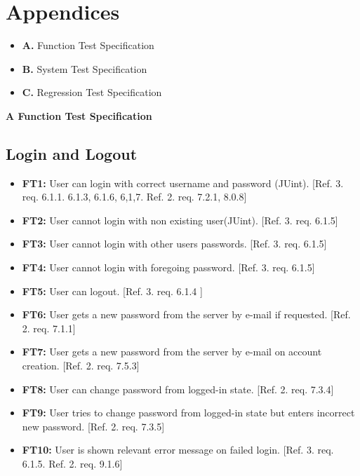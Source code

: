 \documentclass{article}
\begin{document}
\section{Appendices}
	\begin{itemize}
		\item \textbf{A.} Function Test Specification 
		\item \textbf{B.} System Test Specification 	
		\item \textbf{C.} Regression Test Specification 
		\end{itemize}
	
	\newpage
		\begin{flushleft}
		{\large \textbf{A Function Test Specification}}
		\end{flushleft}
		
		\subsection{Login and Logout}
		
		\begin{itemize}
  			\item \textbf{FT1:} User can login with correct username and password (JUint). [Ref. 3. req. 6.1.1. 6.1.3, 6.1.6, 6,1,7. Ref. 2. req. 7.2.1, 8.0.8]	
			
			\item \textbf{FT2:} User cannot login with non existing user(JUint). [Ref. 3. req. 6.1.5]
			
			\item \textbf{FT3:} User cannot login with other users passwords. [Ref. 3. req. 6.1.5]
			
			\item \textbf{FT4:} User cannot login with foregoing password. [Ref. 3. req. 6.1.5]
				
			\item \textbf{FT5:} User can logout. [Ref. 3. req. 6.1.4 ]
			
  			\item \textbf{FT6:} User gets a new password from the server by e-mail if requested. [Ref. 2. req. 7.1.1]
  			
  			\item \textbf{FT7:} User gets a new password from the server by e-mail on account creation. [Ref. 2. req. 7.5.3]
  					
  			\item \textbf{FT8:} User can change password from logged-in state. [Ref. 2. req. 7.3.4] 
  						
  			\item \textbf{FT9:} User tries to change password from logged-in state but enters incorrect new password. [Ref. 2. req. 7.3.5] 

  			\item \textbf{FT10:} User is shown relevant error message on failed login. [Ref. 3. req. 6.1.5. Ref. 2. req. 9.1.6] 
		\end{itemize}
		
\end{document}
